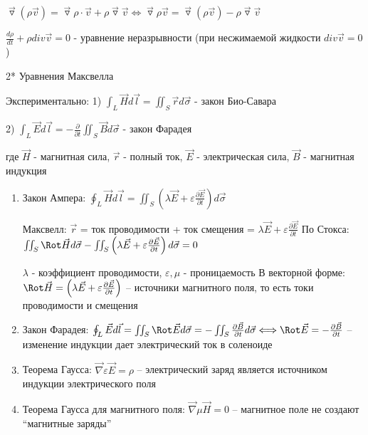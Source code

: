\documentclass[12pt]{article}
\begin{document}

    $\overrightarrow{\triangledown} (\rho \overrightarrow{v}) = \overrightarrow{\triangledown} \rho \cdot \overrightarrow{v} + \rho \overrightarrow{\triangledown} \overrightarrow{v} \Longleftrightarrow \overrightarrow{\triangledown} \rho \overrightarrow{v} = \overrightarrow{\triangledown} (\rho \overrightarrow{v}) - \rho \overrightarrow{\triangledown} \overrightarrow{v}$

    $\frac{d\rho}{dt} + \rho div \overrightarrow{v} = 0$ - уравнение неразрывности (при несжимаемой жидкости $div \overrightarrow{v} = 0$)

    2* Уравнения Максвелла

    Экспериментально: 1) $\int_L \overrightarrow{H} d\overrightarrow{l} = \iint_S \overrightarrow{r}d\overrightarrow{\sigma}$ - закон Био-Савара

    2) $\int_L \overrightarrow{E} d\overrightarrow{l} = -\frac{\partial}{\partial t} \iint_S \overrightarrow{B}d\overrightarrow{\sigma}$ - закон Фарадея

    где $\overrightarrow{H}$ - магнитная сила, $\overrightarrow{r}$ - полный ток, $\overrightarrow{E}$ - электрическая сила, $\overrightarrow{B}$ - магнитная индукция
        \begin{enumerate}
            \item Закон Ампера: $\oint_L \vec{H} d\vec{l} = \iint_S \left(\lambda \vec{E} + \varepsilon \frac{\partial \vec{E}}{\partial t}\right) d\vec{\sigma}$

    Максвелл: $\overrightarrow{r}$ = ток проводимости + ток смещения = $\lambda \overrightarrow{E} + \varepsilon \frac{\partial \overrightarrow{E}}{\partial t}$
            По \Ths Стокса: $\iint_S \Rot \vec{H} d\vec{\sigma} - \iint_S \left(\lambda \vec{E} + \varepsilon \frac{\partial \vec{E}}{\partial t}\right) d\vec{\sigma} = 0$

    $\lambda$ - коэффициент проводимости, $\varepsilon, \mu$ - проницаемость
            В векторной форме: $\Rot \vec{H} = \left(\lambda \vec{E} + \varepsilon \frac{\partial \vec{E}}{\partial t}\right)$ -- источники магнитного поля, то есть токи проводимости и смещения

            \item Закон Фарадея: $\oint_L \vec{E}d\vec{l} = \iint_S \Rot \vec{E}d\vec{\sigma} = -\iint_S \frac{\partial \vec{B}}{\partial t}d\vec{\sigma} \Longleftrightarrow
            \Rot \vec{E} = -\frac{\partial \vec{B}}{\partial t}$ -- изменение индукции дает электрический ток в соленоиде

            \item Теорема Гаусса: $\vec\nabla \varepsilon \vec{E} = \rho$ -- электрический заряд является источником индукции электрического поля

            \item Теорема Гаусса для магнитного поля: $\vec\nabla \mu \vec{H} = 0$ -- магнитное поле не создают \enquote{магнитные заряды}
        \end{enumerate}
\end{document}
